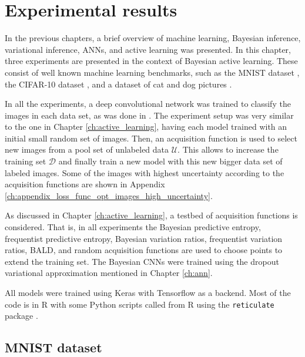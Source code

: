 
\chapter{Experimental results}
\label{ch:results}

In the previous chapters, a brief overview of machine learning, Bayesian inference, variational inference, ANNs, and active learning was presented. In this chapter, three experiments are presented in the context of Bayesian active learning. These consist of well known machine learning benchmarks, such as the MNIST dataset \cite{lecun1998gradient}, the CIFAR-10 dataset \cite{krizhevsky2009learning}, and a dataset of cat and dog pictures \cite{elson2007asirra}.

In all the experiments, a deep convolutional network was trained to classify the images in each data set, as was done in \cite{Gal2016Active}. The experiment setup was very similar to the one in Chapter \ref{ch:active_learning}, having each model trained with an initial small random set of images. Then, an acquisition function is used to select new images from a pool set of unlabeled data $\mathcal{U}$. This allows to increase the training set $\mathcal{D}$ and finally train a new model with this new bigger data set of labeled images. Some of the images with highest uncertainty according to the acquisition functions are shown in Appendix \ref{ch:appendix_loss_func_opt_images_high_uncertainty}.

As discussed in Chapter \ref{ch:active_learning}, a testbed of acquisition functions is considered. That is, in all experiments the Bayesian predictive entropy, frequentist predictive entropy, Bayesian variation ratios, frequentist variation ratios, BALD, and random acquisition functions are used to choose points to extend the training set. The Bayesian CNNs were trained using the dropout variational approximation mentioned in Chapter \ref{ch:ann}.

All models were trained using Keras\cite{chollet2015keras} with Tensorflow \cite{tensorflow2015-whitepaper} as a backend. Most of the code is in R with some Python scripts called from R using the \texttt{reticulate} package \cite{reticulate_package}.

\section{MNIST dataset}

